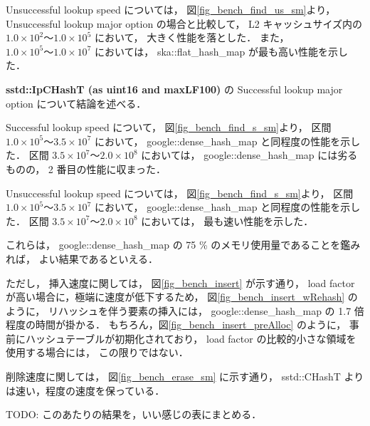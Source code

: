 Unsuccessful lookup speed については，
図\ref{fig_bench_find_us_sm}より，
Unsuccessful lookup major option の場合と比較して，
L2 キャッシュサイズ内の $1.0\times10^2〜1.0\times10^5$ において，
大きく性能を落とした．
また，$1.0\times10^5〜1.0\times10^7$ においては，
ska::flat\_hash\_map が最も高い性能を示した．
\newline

{\bf sstd::IpCHashT (as uint16 and maxLF100)} の Successful lookup major option について結論を述べる．

Successful lookup speed について，
図\ref{fig_bench_find_s_sm}より，
区間 $1.0\times10^5〜3.5\times10^7$ において，
google::dense\_hash\_map と同程度の性能を示した．
区間 $3.5\times10^7〜2.0\times10^8$ においては，
google::dense\_hash\_map には劣るものの，
2 番目の性能に収まった．

Unsuccessful lookup speed については，
図\ref{fig_bench_find_s_sm}より，
区間 $1.0\times10^5〜3.5\times10^7$ において，
google::dense\_hash\_map と同程度の性能を示した．
区間 $3.5\times10^7〜2.0\times10^8$ においては，
最も速い性能を示した．

これらは，
google::dense\_hash\_map の 75 \% のメモリ使用量であることを鑑みれば，
よい結果であるといえる．

ただし，
挿入速度に関しては，
図\ref{fig_bench_insert} が示す通り，
load factor が高い場合に，極端に速度が低下するため，
図\ref{fig_bench_insert_wRehash} のように，
リハッシュを伴う要素の挿入には，
google::dense\_hash\_map の 1.7 倍程度の時間が掛かる．
もちろん，図\ref{fig_bench_insert_preAlloc} のように，
事前にハッシュテーブルが初期化されており，
load factor の比較的小さな領域を使用する場合には，
この限りではない．

削除速度に関しては，
図\ref{fig_bench_erase_sm} に示す通り，
sstd::CHashT よりは速い，程度の速度を保っている．


\leavevmode \newline
\leavevmode \newline
\leavevmode \newline
\leavevmode \newline
\leavevmode \newline
\leavevmode \newline
TODO: このあたりの結果を，いい感じの表にまとめる．
\leavevmode \newline
\leavevmode \newline
\leavevmode \newline
\leavevmode \newline
\leavevmode \newline
\leavevmode \newline


